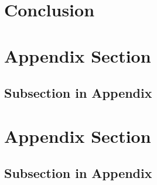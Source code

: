 \documentclass{kaiart}
\begin{document}
\section{Conclusion}
\lipsum[1-2]


\clearpage
\newpage



\clearpage
\newpage
\appendix

\section{Appendix Section}\label{sec:app-a}
\lipsum[3]
\subsection{Subsection in Appendix}
\lipsum[4]
\section{Appendix Section}\label{sec:app-b}
\lipsum[5]
\subsection{Subsection in Appendix}
\lipsum[6]
\end{document}
